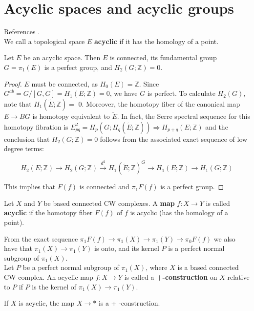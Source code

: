 \section{Acyclic spaces and acyclic groups}

References \cite{karoubiContemporaryDevelopmentsAlgebraic2003,srinivasAlgebraicKTheory1996,weibelKbookIntroductionAlgebraic2013a}.\\

 We call a topological space $E$ \textbf{acyclic} if it has the homology of a point.

\begin{lemm}
    Let $E$ be an acyclic space. Then $E$ is connected, its fundamental group $G=\pi_1(E)$ is a perfect group, and $H_2(G ; \mathbb{Z})=0$.
\end{lemm}
\begin{proof}
    
$E$ must be connected, as $H_0(E)=\mathbb{Z}$. Since $G^{ab} =G /[G, G]=H_1(E ; \mathbb{Z})=0$, we have $G$ is perfect. To calculate $H_2(G)$, note that $H_1(\tilde{E} ; \mathbb{Z})=$ 0. Moreover, the homotopy fiber of the canonical map $E \rightarrow B G$ is homotopy equivalent to $\tilde{E}$. In fact, the Serre spectral sequence for this homotopy fibration is $E_{p q}^2=H_p\left(G ; H_q(\tilde{E} ; \mathbb{Z})\right) \Rightarrow H_{p+q}(E ; \mathbb{Z})$ and the conclusion that $H_2(G ; \mathbb{Z})=0$ follows from the associated exact sequence of low degree terms:

$$
H_2(E ; \mathbb{Z}) \rightarrow H_2(G ; \mathbb{Z}) \xrightarrow{d^2} H_1(\tilde{E} ; \mathbb{Z})^G \rightarrow H_1(E ; \mathbb{Z}) \rightarrow H_1(G ; \mathbb{Z})
$$

This implies that $F(f)$ is connected and $\pi_1 F(f)$ is a perfect group.
\end{proof}
Let $X$ and $Y$ be based connected CW complexes. A \textbf{map} $f: X \rightarrow Y$ is called \textbf{acyclic} if the homotopy fiber $F(f)$ of $f$ is acyclic (has the homology of a point).

From the exact sequence $\pi_1 F(f) \rightarrow \pi_1(X) \rightarrow \pi_1(Y) \rightarrow \pi_0 F(f)$ we also have that $\pi_1(X) \rightarrow \pi_1(Y)$ is onto, and its kernel $P$ is a perfect normal subgroup of $\pi_1(X)$.\\

Let $P$ be a perfect normal subgroup of $\pi_1(X)$, where $X$ is a based connected CW complex. An acyclic map $f: X \rightarrow Y$ is called a \textbf{+-construction} on $X$ relative to $P$ if $P$ is the kernel of $\pi_1(X) \rightarrow \pi_1(Y)$.
\begin{lemm}
 If $X$ is acyclic, the map $X \rightarrow *$ is a + -construction.   
\end{lemm}

